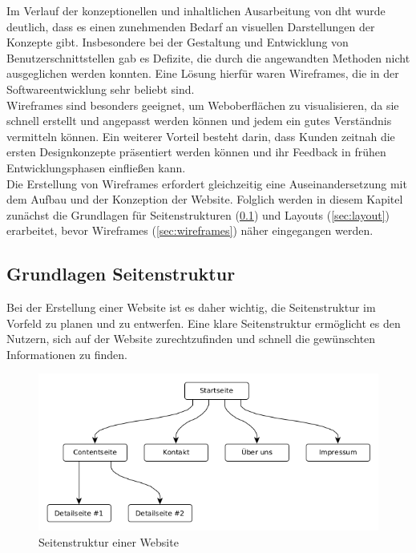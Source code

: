 \label{sec:Grundstrukturen}

Im Verlauf der konzeptionellen und inhaltlichen Ausarbeitung von \acrshort{dht} wurde deutlich, dass es einen zunehmenden Bedarf an visuellen Darstellungen der Konzepte gibt. Insbesondere bei der Gestaltung und Entwicklung von Benutzerschnittstellen gab es Defizite, die durch die angewandten Methoden nicht ausgeglichen werden konnten. Eine Lösung hierfür waren Wireframes, die in der Softwareentwicklung sehr beliebt sind. \\
Wireframes sind besonders geeignet, um Weboberflächen zu visualisieren, da sie schnell erstellt und angepasst werden können und jedem ein gutes Verständnis vermitteln können. Ein weiterer Vorteil besteht darin, dass Kunden zeitnah die ersten Designkonzepte präsentiert werden können und ihr Feedback in frühen Entwicklungsphasen einfließen kann. \\
Die Erstellung von Wireframes erfordert gleichzeitig eine Auseinandersetzung mit dem Aufbau und der Konzeption der Website. Folglich werden in diesem Kapitel zunächst die Grundlagen für Seitenstrukturen (\ref{sec:seitenstruktur}) und Layouts (\ref{sec:layout}) erarbeitet, bevor Wireframes (\ref{sec:wireframes}) näher eingegangen werden.

\subsection{Grundlagen Seitenstruktur}
\label{sec:seitenstruktur}

Bei der Erstellung einer Website ist es daher wichtig, die Seitenstruktur im Vorfeld zu planen und zu entwerfen. Eine klare Seitenstruktur ermöglicht es den Nutzern, sich auf der Website zurechtzufinden und schnell die gewünschten Informationen zu finden.

\begin{figure}[!htb]
    \centering
    \includegraphics[scale=0.55]{figures/jan/Wire_Hierarchie.png}
    \caption[Seitenstruktur einer Website]{Seitenstruktur einer Website}
    \label{fig:seitenstruktur}
\end{figure}

